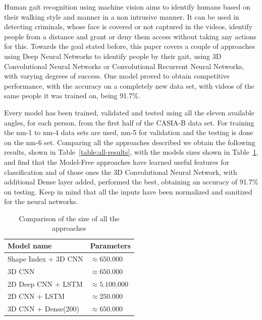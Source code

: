 \documentclass[12pt]{article}
\theoremstyle{definition}
\begin{document}
	Human gait recognition using machine vision aims to identify humans based on their walking style and manner in a non intrusive manner. It can be used in detecting criminals, whose face is covered or not captured in the videos, identify people from a distance and grant or deny them access without taking any actions for this. Towards the goal stated before, this paper covers a couple of approaches using Deep Neural Networks to identify people by their gait, using 3D Convolutional Neural Networks or Convolutional Recurrent Neural Networks, with varying degrees of success. One model proved to obtain competitive performance, with the accuracy on a completely new data set, with videos of the same people it was trained on, being 91.7\%.

	Every model has been trained, validated and tested using all the eleven available angles, for each person, from the first half of the CASIA-B data set. For training the nm-1 to nm-4 data sets are used, nm-5 for validation and the testing is done on the nm-6 set. Comparing all the approaches described we obtain the following results, shown in Table~\ref{table:all-results}, with the models sizes shown in Table~\ref{table:all-size}, and find that the Model-Free approaches have learned useful features for classification and of those ones the 3D Convolutional Neural Network, with additional Dense layer added, performed the best, obtaining an accuracy of 91.7\% on testing. Keep in mind that all the inputs have been normalized and sanitized for the neural networks.

	\begin{table}[h]
		\centering
		\renewcommand{\arraystretch}{1.35}

		\caption{Comparison of the size of all the approaches}
		\label{table:all-size}

		\begin{tabular}{ll}
			\textbf{Model name}  &\textbf{Parameters} \\ \hline
			Shape Index + 3D CNN & $\approx 650.000$   \\ \hline
			3D CNN               & $\approx 650.000$   \\ \hline
			2D Deep CNN + LSTM   & $\approx 5.100.000$ \\ \hline
			2D CNN + LSTM        & $\approx 250.000$   \\ \hline
			3D CNN + Dense(200)  & $\approx 650.000$   \\
		\end{tabular}
	\end{table}
\end{document}
